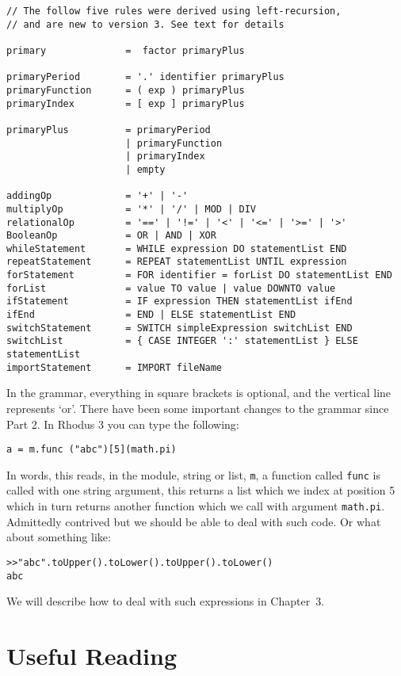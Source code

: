 \begin{verbatim}
// The follow five rules were derived using left-recursion,
// and are new to version 3. See text for details

primary              =  factor primaryPlus

primaryPeriod        = '.' identifier primaryPlus
primaryFunction      = ( exp ) primaryPlus
primaryIndex         = [ exp ] primaryPlus

primaryPlus          = primaryPeriod
                     | primaryFunction
                     | primaryIndex
                     | empty

addingOp             = '+' | '-'
multiplyOp           = '*' | '/' | MOD | DIV
relationalOp         = '==' | '!=' | '<' | '<=' | '>=' | '>'
BooleanOp            = OR | AND | XOR
whileStatement       = WHILE expression DO statementList END
repeatStatement      = REPEAT statementList UNTIL expression
forStatement         = FOR identifier = forList DO statementList END
forList              = value TO value | value DOWNTO value
ifStatement          = IF expression THEN statementList ifEnd
ifEnd                = END | ELSE statementList END
switchStatement      = SWITCH simpleExpression switchList END
switchList           = { CASE INTEGER ':' statementList } ELSE statementList
importStatement      = IMPORT fileName
\end{verbatim}
\normalsize


In the grammar, everything in square brackets is optional, and the vertical line represents `or'. There have been some important changes to the grammar since Part 2. In Rhodus 3 you can type the following:

\begin{lstlisting}
a = m.func ("abc")[5](math.pi)
\end{lstlisting}

In words, this reads, in the module, string or list, {\tt m}, a function called {\tt func} is called with one string argument, this returns a list which we index at position 5 which in turn returns another function which we call with argument {\tt math.pi}. Admittedly contrived but we should be able to deal with such code. Or what about something like:

\begin{lstlisting}
>>"abc".toUpper().toLower().toUpper().toLower()
abc
\end{lstlisting}

We will describe how to deal with such expressions in Chapter~3.%

\section{Useful Reading}

